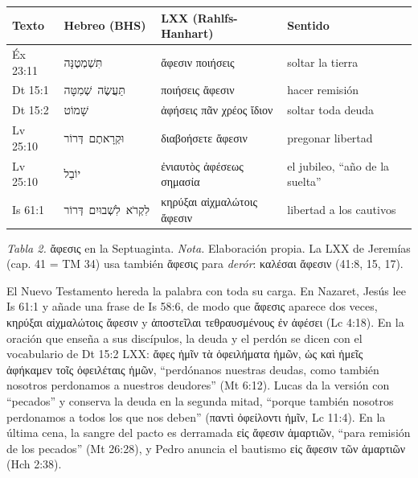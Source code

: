 \documentclass[11pt,letterpaper]{article}
\newcommand{\heb}[1]{\mbox{\foreignlanguage{hebrew}{#1}}}
\newcommand{\grc}[1]{\foreignlanguage{ancientgreek}{#1}}
\begin{document}
\begin{center}\small\renewcommand{\arraystretch}{1.2}
\begin{tabular}{@{}L{2.2cm}L{3.8cm}L{4.4cm}L{4.0cm}@{}}
\toprule
\textbf{Texto} & \textbf{Hebreo (BHS)} & \textbf{LXX (Rahlfs-Hanhart)} & \textbf{Sentido} \\ \midrule
Éx 23:11 & \heb{תִּשְׁמְטֶנָּה} & \grc{ἄφεσιν ποιήσεις} & soltar la tierra \\
Dt 15:1 & \heb{תַּעֲשֶׂה שְׁמִטָּה} & \grc{ποιήσεις ἄφεσιν} & hacer remisión \\
Dt 15:2 & \heb{שָׁמוֹט} & \grc{ἀφήσεις πᾶν χρέος ἴδιον} & soltar toda deuda \\
Lv 25:10 & \heb{וּקְרָאתֶם דְּרוֹר} & \grc{διαβοήσετε ἄφεσιν} & pregonar libertad \\
Lv 25:10 & \heb{יוֹבֵל} & \grc{ἐνιαυτὸς ἀφέσεως σημασία} & el jubileo, ``año de la suelta'' \\
Is 61:1 & \heb{לִקְרֹא לִשְׁבוּיִם דְּרוֹר} & \grc{κηρύξαι αἰχμαλώτοις ἄφεσιν} & libertad a los cautivos \\
\bottomrule
\end{tabular}\par
{\footnotesize\color{sepia}\textit{Tabla 2.} \grc{ἄφεσις} en la Septuaginta. \textit{Nota.} Elaboración propia. La LXX de Jeremías (cap. 41 = TM 34) usa también \grc{ἄφεσις} para \emph{derór}: \grc{καλέσαι ἄφεσιν} (41:8, 15, 17).}
\end{center}

El Nuevo Testamento hereda la palabra con toda su carga. En Nazaret, Jesús lee Is 61:1 y añade una frase de Is 58:6, de modo que \grc{ἄφεσις} aparece dos veces, \grc{κηρύξαι αἰχμαλώτοις ἄφεσιν} y \grc{ἀποστεῖλαι τεθραυσμένους ἐν ἀφέσει} (Lc 4:18). En la oración que enseña a sus discípulos, la deuda y el perdón se dicen con el vocabulario de Dt 15:2 LXX: \grc{ἄφες ἡμῖν τὰ ὀφειλήματα ἡμῶν, ὡς καὶ ἡμεῖς ἀφήκαμεν τοῖς ὀφειλέταις ἡμῶν}, ``perdónanos nuestras deudas, como también nosotros perdonamos a nuestros deudores'' (Mt 6:12). Lucas da la versión con ``pecados'' y conserva la deuda en la segunda mitad, ``porque también nosotros perdonamos a todos los que nos deben'' (\grc{παντὶ ὀφείλοντι ἡμῖν}, Lc 11:4). En la última cena, la sangre del pacto es derramada \grc{εἰς ἄφεσιν ἁμαρτιῶν}, ``para remisión de los pecados'' (Mt 26:28), y Pedro anuncia el bautismo \grc{εἰς ἄφεσιν τῶν ἁμαρτιῶν} (Hch 2:38).
\end{document}
